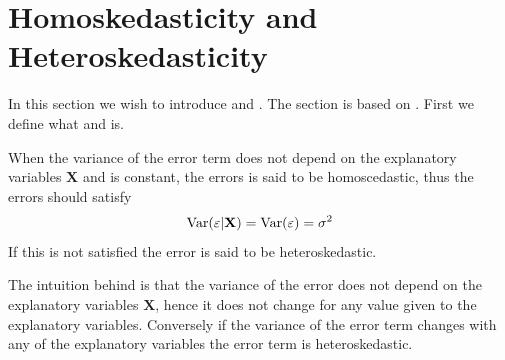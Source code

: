 \newpage
\section{Homoskedasticity and Heteroskedasticity}

In this section we wish to introduce \homo and \hetero. The section is based on \cite{Wooldridge2012}. First we define what \homo and \hetero is. 

\begin{definition}
When the variance of the error term does not depend on the explanatory variables $\mathbf{X}$ and is constant, the errors is said to be homoscedastic, thus the errors should satisfy
\begin{align*}
    \operatorname{\text{Var}}(\varepsilon | \mathbf{X}) = \operatorname{\text{Var}}(\varepsilon) = \sigma^2
\end{align*}
If this is not satisfied the error is said to be heteroskedastic. 

\end{definition}

The intuition behind \homo is that the variance of the error does not depend on the explanatory variables $\mathbf{X}$, hence it does not change for any value given to the explanatory variables. Conversely if the variance of the error term changes with any of the explanatory variables the error term is heteroskedastic. 

